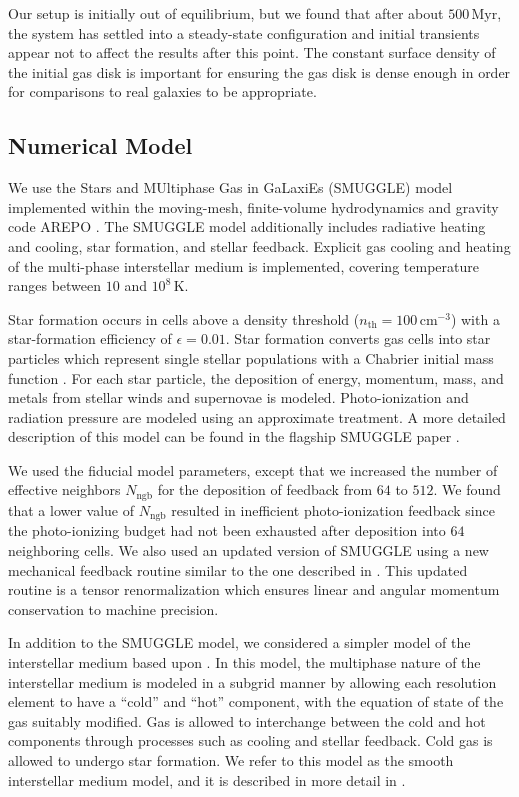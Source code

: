 \documentclass[fleqn,usenatbib]{mnras}
\newcommand{\AREPO}{\textsc{AREPO}}
\begin{document}
Our setup is initially out of equilibrium, but we found that after about
$500\,\textrm{Myr}$, the system has settled into a steady-state configuration
and initial transients appear not to affect the results after this point. The
constant surface density of the initial gas disk is important for ensuring the
gas disk is dense enough in order for comparisons to real galaxies to be
appropriate.

\subsection{Numerical Model}
We use the Stars and MUltiphase Gas in GaLaxiEs (SMUGGLE) model
\citep{2019MNRAS.489.4233M} implemented within the moving-mesh, finite-volume
hydrodynamics and gravity code \AREPO{} \citep{2010MNRAS.401..791S}. The SMUGGLE
model additionally includes radiative heating and cooling, star formation, and
stellar feedback. Explicit gas cooling and heating of the multi-phase
interstellar medium is implemented, covering temperature ranges between $10$ and
$10^8\,\textrm{K}$.

Star formation occurs in cells above a density threshold
($n_{\textrm{th}}=100\,\textrm{cm}^{-3}$) with a star-formation efficiency of
$\epsilon = 0.01$. Star formation converts gas cells into star particles which
represent single stellar populations with a Chabrier initial mass
function \citep{2003PASP..115..763C}. For each star particle, the deposition of
energy, momentum, mass, and metals from stellar winds and supernovae is modeled.
Photo-ionization and radiation pressure are modeled using an approximate
treatment. A more detailed description of this model can be found in the
flagship SMUGGLE paper \citep{2019MNRAS.489.4233M}.

We used the fiducial model parameters, except that we increased the number of
effective neighbors $N_{\textrm{ngb}}$ for the deposition of feedback from
$64$ to $512$. We found that a lower value of $N_{\textrm{ngb}}$ resulted in
inefficient photo-ionization feedback since the photo-ionizing budget had not
been exhausted after deposition into $64$ neighboring cells. We also used an
updated version of SMUGGLE using a new mechanical feedback routine similar to
the one described in \citet{2018MNRAS.480..800H}. This updated routine is a
tensor renormalization which ensures linear and angular momentum conservation
to machine precision.

In addition to the SMUGGLE model, we considered a simpler model of the
interstellar medium based upon \citet{2003MNRAS.339..289S}. In this model, the
multiphase nature of the interstellar medium is modeled in a subgrid manner by
allowing each resolution element to have a ``cold'' and ``hot'' component, with
the equation of state of the gas suitably modified. Gas is allowed to
interchange between the cold and hot components through processes such as
cooling and stellar feedback. Cold gas is allowed to undergo star formation. We
refer to this model as the smooth interstellar medium model, and it is described
in more detail in \citet{2019MNRAS.489.4233M}.
\end{document}
